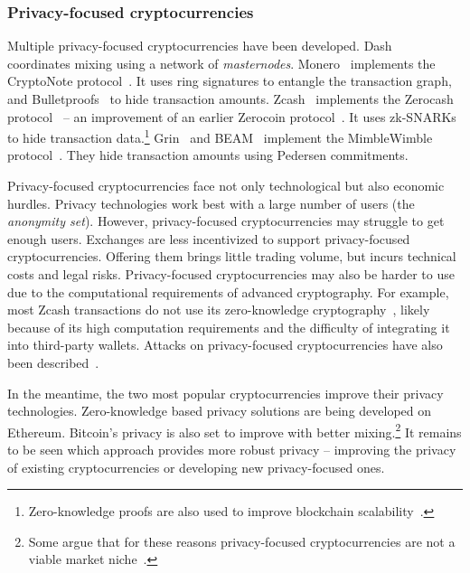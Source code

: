 \subsubsection*{Privacy-focused cryptocurrencies}

Multiple privacy-focused cryptocurrencies have been developed.
Dash~\cite{Dash} coordinates mixing using a network of \textit{masternodes}.
Monero~\cite{Monero} implements the CryptoNote protocol~\cite{Saberhagen2013}.
It uses ring signatures to entangle the transaction graph, and Bulletproofs~\cite{Buenz2018} to hide transaction amounts.
Zcash~\cite{Zcash} implements the Zerocash protocol~\cite{BenSasson2014, Hopwood2020} -- an improvement of an earlier Zerocoin protocol~\cite{Miers2013}.
It uses zk-SNARKs~\cite{BenSasson2014a} to hide transaction data.\footnote{Zero-knowledge proofs are also used to improve blockchain scalability~\cite{Bonneau2020}.}
Grin~\cite{Grin} and BEAM~\cite{Beam} implement the MimbleWimble protocol~\cite{Jedusor2016}.
They hide transaction amounts using Pedersen commitments.

Privacy-focused cryptocurrencies face not only technological but also economic hurdles.
Privacy technologies work best with a large number of users (the \textit{anonymity set}).
However, privacy-focused cryptocurrencies may struggle to get enough users.
Exchanges are less incentivized to support privacy-focused cryptocurrencies.
Offering them brings little trading volume, but incurs technical costs and legal risks.
Privacy-focused cryptocurrencies may also be harder to use due to the computational requirements of advanced cryptography.
For example, most Zcash transactions do not use its zero-knowledge cryptography~\cite{Quesnelle2017, Biryukov2019c}, likely because of its high computation requirements and the difficulty of integrating it into third-party wallets.
Attacks on privacy-focused cryptocurrencies have also been described~\cite{Quesnelle2017, Moeser2018, Biryukov2019d, Biryukov2019e, Tramer2020}.

In the meantime, the two most popular cryptocurrencies improve their privacy technologies.
Zero-knowledge based privacy solutions are being developed on Ethereum.
Bitcoin's privacy is also set to improve with better mixing.\footnote{Some argue that for these reasons privacy-focused cryptocurrencies are not a viable market niche~\cite{Gentry2019}.}
It remains to be seen which approach provides more robust privacy -- improving the privacy of existing cryptocurrencies or developing new privacy-focused ones.


